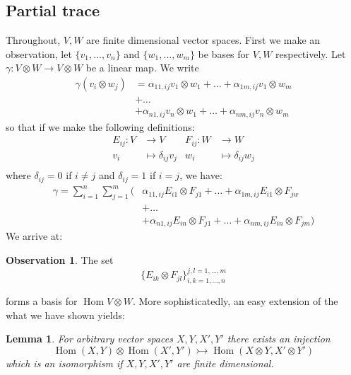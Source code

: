 \documentclass[12pt]{article}
\theoremstyle{plain}
\newtheorem{lemma}[thm]{Lemma}
\theoremstyle{definition}
\newtheorem{observation}[thm]{Observation}
\newcommand{\lto}{\longrightarrow}
\begin{document}
\subsection{Partial trace}
Throughout, $V,W$ are finite dimensional vector spaces. First we make an observation, let $\lbrace v_1,...,v_n
\rbrace$ and $\lbrace w_1,...,w_m\rbrace$ be bases for $V,W$ respectively. Let $\gamma: V \otimes W \lto V \otimes W$ be a linear map. We write
\begin{align*}
\gamma(v_i \otimes w_j) &= \alpha_{11,ij}v_1 \otimes w_1 + \hdots + \alpha_{1m,ij}v_1 \otimes w_m\\
&+ \hdots\\
&+ \alpha_{n1,ij}v_n \otimes w_1 + \hdots + \alpha_{nm,ij}v_n \otimes w_m
\end{align*}
so that if we make the following definitions:
\begin{align*}
E_{ij}: V &\lto V & F_{ij}: W &\lto W\\
v_i &\longmapsto \delta_{ij}v_j & w_i &\longmapsto \delta_{ij}w_j\\
\end{align*}
where $\delta_{ij} = 0$ if $i \neq j$ and $\delta_{ij} = 1$ if $i = j$, we have:
\begin{align*}
\gamma = \sum_{i = 1}^n\sum_{j = 1}^m\Big(&\alpha_{11,ij}E_{i1}\otimes F_{j1} + \hdots + \alpha_{1m,ij}E_{i1} \otimes F_{jw}\\
&+ \hdots\\
&+ \alpha_{n1,ij}E_{in} \otimes F_{j1} + \hdots + \alpha_{nm,ij}E_{in} \otimes F_{jm}\Big)
\end{align*}
We arrive at: 
\begin{observation}\label{obs:basis}
The set
\begin{equation}
\lbrace E_{ik} \otimes F_{jl}\rbrace_{i,k = 1,...,n}^{j,l =1,...,m}
\end{equation}
\end{observation}
forms a basis for $\operatorname{Hom}V \otimes W$. More sophisticatedly, an easy extension of the what we have shown yields:
\begin{lemma}\label{lem:embedding_tensor}
For arbitrary vector spaces $X,Y,X',Y'$ there exists an injection
\begin{equation}
\operatorname{Hom}(X,Y) \otimes \operatorname{Hom}(X',Y') \rightarrowtail \operatorname{Hom}(X \otimes Y, X'\otimes Y')
\end{equation}
which is an isomorphism if $X,Y,X',Y'$ are finite dimensional.
\end{lemma}
\end{document}
